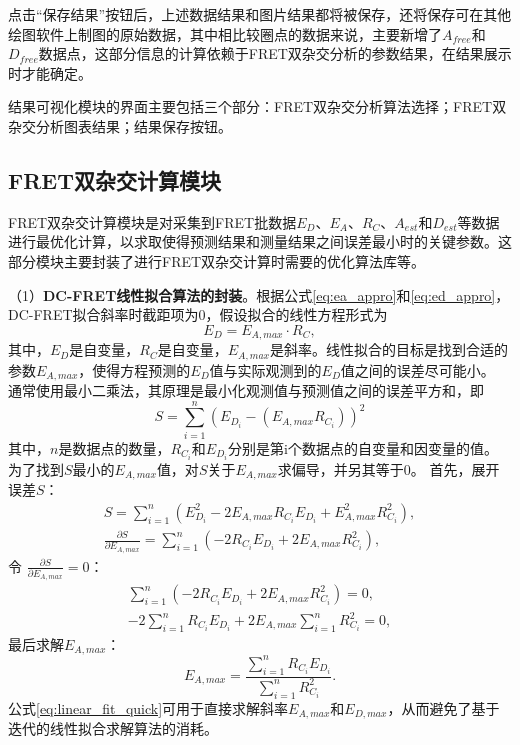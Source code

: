 点击“保存结果”按钮后，上述数据结果和图片结果都将被保存，还将保存可在其他绘图软件上制图的原始数据，其中相比较圈点的数据来说，主要新增了$A_{free}$和$D_{free}$数据点，这部分信息的计算依赖于FRET双杂交分析的参数结果，在结果展示时才能确定。

结果可视化模块的界面主要包括三个部分：FRET双杂交分析算法选择；FRET双杂交分析图表结果；结果保存按钮。
\fi

\subsection{FRET双杂交计算模块}
FRET双杂交计算模块是对采集到FRET批数据$E_D$、$E_A$、$R_C$、$A_{est}$和$D_{est}$等数据进行最优化计算，以求取使得预测结果和测量结果之间误差最小时的关键参数。这部分模块主要封装了进行FRET双杂交计算时需要的优化算法库等。

（1）\textbf{DC-FRET线性拟合算法的封装}。根据公式\ref{eq:ea_appro}和\ref{eq:ed_appro}，DC-FRET拟合斜率时截距项为0，假设拟合的线性方程形式为
\begin{equation}
    E_D = E_{A,max}\cdot R_C,
\end{equation}
其中，$E_D$是自变量，$R_C$是自变量，$E_{A,max}$是斜率。线性拟合的目标是找到合适的参数$E_{A,max}$，使得方程预测的$E_D$值与实际观测到的$E_D$值之间的误差尽可能小。
通常使用最小二乘法，其原理是最小化观测值与预测值之间的误差平方和，即
\begin{equation}
    S=\sum^{n}_{i=1}(E_{D_i}-(E_{A,max}R_{C_i}))^2
\end{equation}
其中，$n$是数据点的数量，$R_{C_i}$和$E_{D_i}$分别是第i个数据点的自变量和因变量的值。
为了找到$S$最小的$E_{A,max}$值，对$S$关于$E_{A,max}$求偏导，并另其等于0。
首先，展开误差$S$：
\begin{align}
     S=\sum_{i = 1}^{n}(E_{D_i}^{2}-2E_{A,max}R_{C_i}E_{D_i} + E_{A,max}^{2}R_{C_i}^{2}), \\
     \frac{\partial S}{\partial E_{A,max}}=\sum_{i = 1}^{n}(-2R_{C_i}E_{D_i} + 2E_{A,max}R_{C_i}^{2}),
\end{align}
令 \(\frac{\partial S}{\partial E_{A,max}}=0\)：
\begin{align}
     \sum_{i = 1}^{n}(-2R_{C_i}E_{D_i} + 2E_{A,max}R_{C_i}^{2}) = 0, \\
    -2\sum_{i = 1}^{n}R_{C_i}E_{D_i}+2E_{A,max}\sum_{i = 1}^{n}R_{C_i}^{2}=0,
\end{align}
最后求解$E_{A,max}$：
\begin{equation}
       E_{A,max}=\frac{\sum_{i = 1}^{n}R_{C_i}E_{D_i}}{\sum_{i = 1}^{n}R_{C_i}^{2}}. \label{eq:linear_fit_quick}
\end{equation}
公式\ref{eq:linear_fit_quick}可用于直接求解斜率$E_{A,max}$和$E_{D,max}$，从而避免了基于迭代的线性拟合求解算法的消耗。

